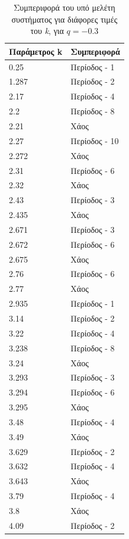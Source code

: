 \begin{table}[ht]
	\centering
	\caption{ Συμπεριφορά του υπό μελέτη συστήματος για διάφορες τιμές του \emph{k}, για $q=-0.3$ }
	\label{tab:abc10}
	\begin{tabular}{l | l}
		Παράμετρος k & Συμπεριφορά \\
		\hline
		0.25 &  Περίοδος -  1 \\
		1.287 &  Περίοδος -  2 \\
		2.17& Περίοδος -  4 \\
		2.2& Περίοδος -  8 \\
		2.21 & Xάος \\
		2.27& Περίοδος - 10 \\
		2.272& Χάος \\
		2.31& Περίοδος - 6 \\
		2.32 &  Χάος \\
		2.43 &  Περίοδος -  3 \\
		2.435 &  Χάος \\
		2.671 &  Περίοδος -  3\\
		2.672 & Περίοδος - 6\\
		2.675 & Χάος\\
		2.76 &Περίοδος - 6 \\
		2.77& Χάος\\
		2.935 & Περίοδος -  1\\
		3.14& Περίοδος - 2\\
		3.22 & Περίοδος -  4\\
		3.238 & Περίοδος -  8\\
		3.24 & Χάος\\
		3.293 & Περίοδος -  3\\
		3.294 & Περίοδος -  6\\
		3.295 & Χάος\\
		3.48& Περίοδος -  4\\
		3.49 & Χάος\\
		3.629 &  Περίοδος -  2\\
		3.632 &  Περίοδος -  4 \\
		3.643 & Χάος\\
		3.79 & Περίοδος -  4\\
		3.8 & Χάος\\
		4.09 & Περίοδος -  2\\
		
		
	\end{tabular}
	
\end{table}


